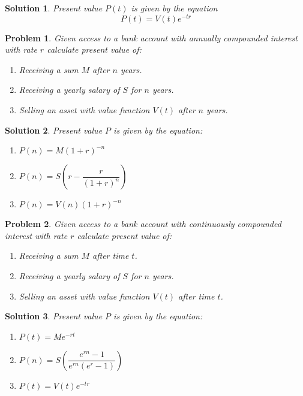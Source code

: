\documentclass[11pt,a4paper, margin]{article}
\theoremstyle{break}
\newtheorem*{problem}{Problem}
\theoremstyle{break}
\newtheorem*{solution}{Solution}
\begin{document}
\begin{solution}
Present value $P(t)$ is given by the equation \[ P(t) = V(t)e^{-tr} \]
\end{solution}

\begin{problem}
Given access to a bank account with annually compounded interest with rate $r$ calculate present value of:
\begin{enumerate}
	\item Receiving a sum $M$ after $n$ years.
	\item Receiving a yearly salary of $S$ for $n$ years.
	\item Selling an asset with value function $V(t)$ after $n$ years. 
\end{enumerate}
\end{problem}

\begin{solution}
Present value $P$ is given by the equation:
\begin{enumerate}
	\item $P(n) = M(1+r)^{-n}$
	\item $P(n) = S(r - \dfrac{r}{(1+r)^{n}})$
	\item $P(n) = V(n)(1+r)^{-n}$
\end{enumerate}
\end{solution}

\begin{problem}
Given access to a bank account with continuously compounded interest with rate $r$ calculate present value of:
\begin{enumerate}
	\item Receiving a sum $M$ after time $t$.
	\item Receiving a yearly salary of $S$ for $n$ years.
	\item Selling an asset with value function $V(t)$ after time $t$. 
\end{enumerate}
\end{problem}

\begin{solution}
Present value $P$ is given by the equation:
\begin{enumerate}
	\item $P(t) = Me^{-rt}$
	\item $P(n) = S(\dfrac{e^{rn}-1}{e^{rn}(e^r-1)})$
	\item $P(t) = V(t)e^{-tr}$
\end{enumerate}
\end{solution}
\end{document}
